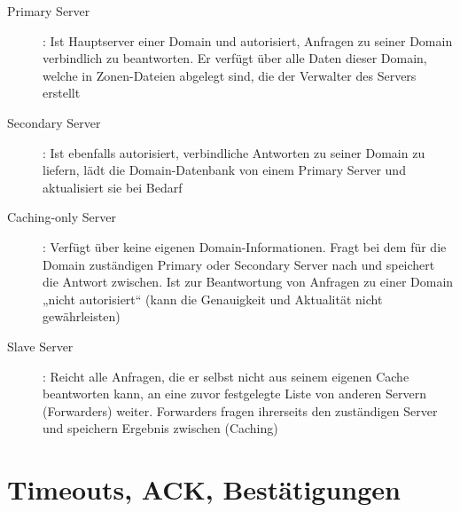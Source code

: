 \documentclass{article} %
\begin{document}
\begin{description}
\item[Primary Server]: Ist Hauptserver einer Domain und autorisiert, Anfragen zu seiner Domain verbindlich zu
beantworten.
Er verfügt über alle Daten dieser Domain, welche in Zonen-Dateien abgelegt sind, die der Verwalter des
Servers erstellt
\item[Secondary Server]: Ist ebenfalls autorisiert, verbindliche Antworten zu seiner
Domain zu liefern, lädt die Domain-Datenbank von einem Primary Server und aktualisiert sie bei Bedarf
\item[Caching-only Server]: Verfügt über keine eigenen Domain-Informationen.
Fragt bei dem für die Domain zuständigen Primary oder Secondary Server nach und speichert die Antwort zwischen.
Ist zur Beantwortung von Anfragen zu einer Domain „nicht autorisiert“ (kann die Genauigkeit und Aktualität nicht gewährleisten)
\item[Slave	Server]: Reicht alle Anfragen, die er selbst nicht aus seinem eigenen Cache beantworten kann, an eine zuvor festgelegte Liste von anderen Servern (Forwarders) weiter.
Forwarders fragen ihrerseits den zuständigen Server und speichern Ergebnis zwischen (Caching)
\end{description}



\section{Timeouts, ACK, Bestätigungen}
\end{document}
